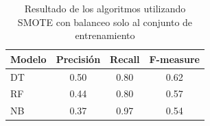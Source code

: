 \begin{table}[H]
\centering
\captionsetup{labelsep=period, labelfont=bf}
\caption{Resultado de los algoritmos utilizando SMOTE con balanceo solo al conjunto de entrenamiento}
\fontsize{12pt}{10pt}\selectfont
\begin{tabular}{lccc}
\hline
\textbf{Modelo} & \textbf{Precisión} & \textbf{Recall} & \textbf{F-measure} \\
\hline
DT & 0.50 & 0.80 & 0.62 \\
RF & 0.44 & 0.80 & 0.57 \\
NB & 0.37 & 0.97 & 0.54 \\
\hline
\end{tabular}

\label{tab:results_smote_sin}
\end{table}
